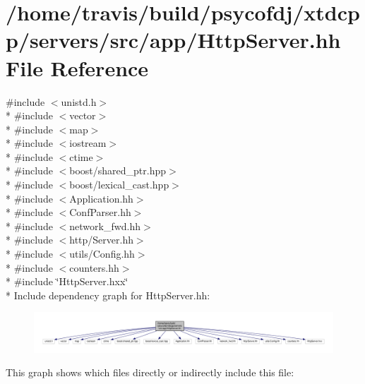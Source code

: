 \hypertarget{HttpServer_8hh}{\section{/home/travis/build/psycofdj/xtdcpp/servers/src/app/\-Http\-Server.hh File Reference}
\label{HttpServer_8hh}
}
{\ttfamily \#include $<$unistd.\-h$>$}\\*
{\ttfamily \#include $<$vector$>$}\\*
{\ttfamily \#include $<$map$>$}\\*
{\ttfamily \#include $<$iostream$>$}\\*
{\ttfamily \#include $<$ctime$>$}\\*
{\ttfamily \#include $<$boost/shared\-\_\-ptr.\-hpp$>$}\\*
{\ttfamily \#include $<$boost/lexical\-\_\-cast.\-hpp$>$}\\*
{\ttfamily \#include $<$Application.\-hh$>$}\\*
{\ttfamily \#include $<$Conf\-Parser.\-hh$>$}\\*
{\ttfamily \#include $<$network\-\_\-fwd.\-hh$>$}\\*
{\ttfamily \#include $<$http/\-Server.\-hh$>$}\\*
{\ttfamily \#include $<$utils/\-Config.\-hh$>$}\\*
{\ttfamily \#include $<$counters.\-hh$>$}\\*
{\ttfamily \#include \char`\"{}Http\-Server.\-hxx\char`\"{}}\\*
Include dependency graph for Http\-Server.\-hh\-:
\nopagebreak
\begin{figure}[H]
\begin{center}
\leavevmode
\includegraphics[width=350pt]{HttpServer_8hh__incl}
\end{center}
\end{figure}
This graph shows which files directly or indirectly include this file\-:
\nopagebreak

